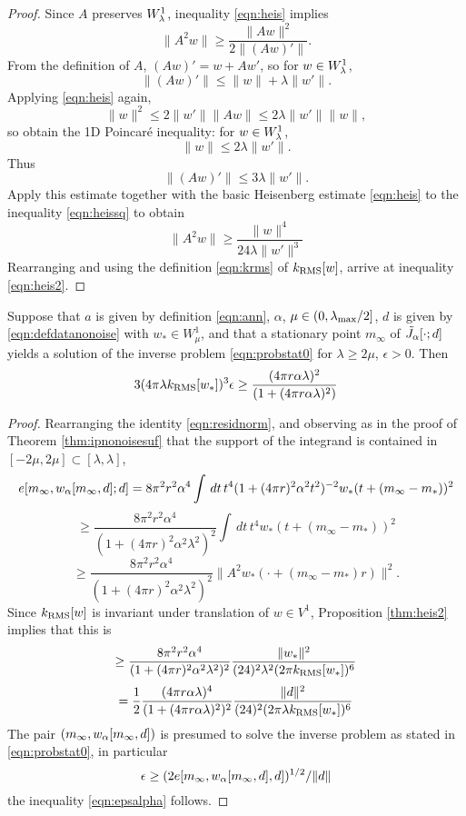 \begin{proof}
  Since $A$  preserves $W_{\lambda}^1$, inequality \ref{eqn:heis} implies
  \begin{equation}
    \label{eqn:heissq}
    \|A^2w\| \ge \frac{\|Aw\|^2}{2\|(Aw)'\|}.
  \end{equation}
  From the definition of $A$, $(Aw)'=w +Aw'$, so for $w \in W_{\lambda}^1$,
  \[
    \|(Aw)'\| \le \|w\|+ \lambda\|w'\|.
  \]
  Applying \ref{eqn:heis} again,
  \[
    \|w\|^2 \le 2\|w'\|\|Aw\|\le 2\lambda \|w'\|\|w\|,
  \]
  so obtain the 1D Poincar\'{e} inequality: for $w \in W_{\lambda}^1$,
  \[
    \|w\| \le 2\lambda\|w'\|.
  \]
  Thus
  \[
    \|(Aw)'\| \le 3\lambda\|w'\|.
  \]
  Apply this estimate together with the basic Heisenberg estimate
  \ref{eqn:heis} to the inequality \ref{eqn:heissq} to obtain
  \[
    \|A^2w\| \ge \frac{\|w\|^4}{24\lambda \|w'\|^3}
  \]
  Rearranging and using the definition \ref{eqn:krms} of $k_{\rm RMS}[w]$,
  arrive at inequality \ref{eqn:heis2}.
\end{proof}

\begin{theorem}
  \label{thm:ipnonoisenec}
  Suppose that $a$ is given by definition \ref{eqn:ann}, $\alpha$,
  $\mu \in (0,\lambda_{\rm max}/2]$, $d$ is given by
  \ref{eqn:defdatanonoise} with $w_* \in W_{\mu}^1$, and that a
  stationary point $m_{\infty}$ of $\tilde{J}_{\alpha}[\cdot;d]$ yields a solution
  of the inverse problem \ref{eqn:probstat0} for $\lambda \ge 2\mu$,
  $\epsilon>0$. Then
\begin{equation}
  \label{eqn:epsalpha}
  3 (4\pi \lambda k_{\rm RMS}[w_*])^3 \epsilon \ge \frac{(4\pi  r\alpha\lambda)^2}
  {(1+(4\pi r \alpha \lambda)^2)}
\end{equation}
\end{theorem}

\begin{proof}
  Rearranging the identity \ref{eqn:residnorm}, and observing as in
  the proof of Theorem \ref{thm:ipnonoisesuf} that the support of the
  integrand is contained in $[-2\mu, 2\mu] \subset [\lambda,\lambda]$,
  \[
  e[m_{\infty},w_{\alpha}[m_{\infty},d];d] 
= 8 \pi^2 r^2 \alpha^4\int\,dt\,t^4(1+(4\pi r)^2 \alpha^2 t^2)^{-2}w_*(t+(m_{\infty}-m_*))^2
\]
\[
  \ge \frac{8\pi^2r^2\alpha^4}{(1+(4\pi r)^2 \alpha^2
    \lambda^2)^{2}}\int\,dt\,t^4w_*(t+(m_{\infty}-m_*))^2
\]
\begin{equation}
  \label{eqn:residnormbis}
  \ge \frac{8\pi^2r^2\alpha^4}{(1+(4\pi r)^2 \alpha^2
    \lambda^2)^{2}}\|A^2w_*(\cdot + (m_{\infty}-m_*)r)\|^2.
 \end{equation}
Since $k_{\rm RMS}[w]$ is invariant under translation of $w \in V^1$,
Proposition \ref{thm:heis2} implies that this is
\[
  \ge \frac{8\pi^2r^2\alpha^4}{(1+(4\pi r)^2 \alpha^2
    \lambda^2)^{2}}\frac{\|w_*\|^2}{(24)^2 \lambda^2 (2\pi k_{\rm RMS}[w_*])^6}
\]
\[
  = \frac{1}{2}\frac{(4\pi r\alpha\lambda)^4}{(1+(4\pi r \alpha
    \lambda)^2)^{2}}\frac{\|d\|^2}{(24)^2 (2\pi
    \lambda k_{\rm RMS}[w_*])^6}
\]
The pair $(m_{\infty}, w_{\alpha}[m_{\infty},d])$ is presumed to solve the inverse
problem as stated in \ref{eqn:probstat0}, in particular
\[
  \epsilon \ge (2 e[m_{\infty}, w_{\alpha}[m_{\infty},d],d])^{1/2}/\|d\|
\]
the inequality \ref{eqn:epsalpha} follows.

\end{proof}

